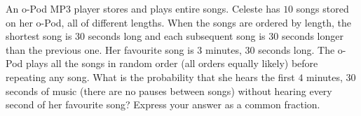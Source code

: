 An o-Pod MP3 player stores and plays entire songs. Celeste has $10$ songs stored on her o-Pod, all of different lengths. When the songs are ordered by length, the shortest song is $30$ seconds long and each subsequent song is $30$ seconds longer than the previous one. Her favourite song is $3$ minutes, $30$ seconds long. The o-Pod plays all the songs in random order (all orders equally likely) before repeating any song. What is the probability that she hears the first $4$ minutes, $30$ seconds of music (there are no pauses between songs) without hearing every second of her favourite song? Express your answer as a common fraction.

